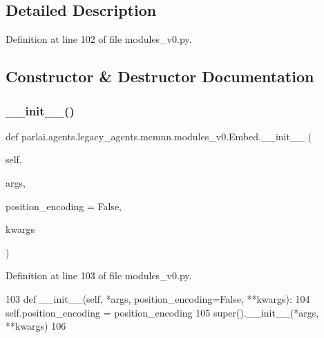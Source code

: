 \subsection{Detailed Description}


Definition at line 102 of file modules\+\_\+v0.\+py.



\subsection{Constructor \& Destructor Documentation}
\mbox{\label{classparlai_1_1agents_1_1legacy__agents_1_1memnn_1_1modules__v0_1_1Embed_aee1b369b4a7f6b23788e30e2dc3e439f}} 
\subsubsection{\texorpdfstring{\+\_\+\+\_\+init\+\_\+\+\_\+()}{\_\_init\_\_()}}
{\footnotesize\ttfamily def parlai.\+agents.\+legacy\+\_\+agents.\+memnn.\+modules\+\_\+v0.\+Embed.\+\_\+\+\_\+init\+\_\+\+\_\+ (\begin{DoxyParamCaption}\item[{}]{self,  }\item[{}]{args,  }\item[{}]{position\+\_\+encoding = {\ttfamily False},  }\item[{}]{kwargs }\end{DoxyParamCaption})}



Definition at line 103 of file modules\+\_\+v0.\+py.


\begin{DoxyCode}
103     \textcolor{keyword}{def }\_\_init\_\_(self, *args, position\_encoding=False, **kwargs):
104         self.position\_encoding = position\_encoding
105         super().\_\_init\_\_(*args, **kwargs)
106 
\end{DoxyCode}


